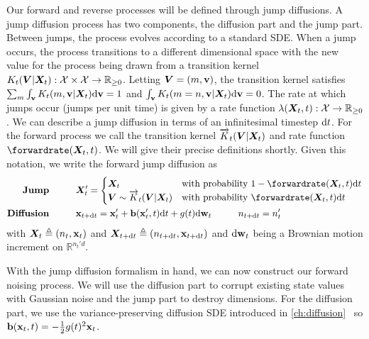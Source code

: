 Our forward and reverse processes will be defined through jump diffusions. A jump diffusion process has two components, the diffusion part and the jump part. Between jumps, the process evolves according to a standard SDE. When a jump occurs, the process transitions to a different dimensional space with the new value for the process being drawn from a transition kernel $K_t({\bm{V}} | {\bm{X}}_t): {\mathcal{X}} \times {\mathcal{X}} \rightarrow  \mathbb{R}_{\geq 0}$. Letting ${\bm{V}} = (m, {\mathbf{v}})$, the transition kernel satisfies $\sum_m \int_{\mathbf{v}} K_t(m, {\mathbf{v}} | {\bm{X}}_t) \mathrm{d} {\mathbf{v}} = 1$ and $\int_{\mathbf{v}} K_t(m=n, {\mathbf{v}} | {\bm{X}}_t) \mathrm{d} {\mathbf{v}} = 0$. The rate at which jumps occur (jumps per unit time) is given by a rate function $\lambda({\bm{X}}_t, t): \mathcal{X} \rightarrow \mathbb{R}_{\geq 0}$. 
We can describe a jump diffusion in terms of an infinitesimal timestep $\mathrm{d} t$. For the forward process we call the transition kernel $\overrightarrow{K}_t({\bm{V}}|{\bm{X}}_t)$ and rate function $\forwardrate(\mX_t, t)$. We will give their precise definitions shortly. Given this notation, we write the forward jump diffusion as
\begin{align}
    \textbf{Jump} \hspace{1cm} & \mX_t' = \begin{cases}
        \mX_t & \text{with probability } 1 - \forwardrate(\mX_t, t) \rmd t \\
        \mV \sim \ftk_t( \mV |\mX_t) & \text{with probability } \forwardrate(\mX_t, t) \rmd t
    \end{cases}  \label{eq:tddm-forward-jump} \\
    \textbf{Diffusion} \hspace{1cm} &\rvx_{t+ \rmd t} = \rvx'_t + \rvb(\rvx'_t, t) \rmd t + g(t) \rmd \brown_t \hspace{1cm} n_{t+\rmd t} = n_t'
     \label{eq:tddm-forward-diffusion}
\end{align}
with ${\bm{X}}_t \triangleq (n_t, {\mathbf{x}}_t)$ and ${\bm{X}}_{t+\mathrm{d} t} \triangleq (n_{t+\mathrm{d} t}, {\mathbf{x}}_{t + \mathrm{d} t})$ and $\mathrm{d} \mathbf{w}_t$ being a Brownian motion increment on $\mathbb{R}^{n_t'd}$.

With the jump diffusion formalism in hand, we can now construct our forward noising process. We will use the diffusion part to corrupt existing state values with Gaussian noise and the jump part to destroy dimensions. For the diffusion part, we use the variance-preserving diffusion SDE introduced in \cref{ch:diffusion}~\citep{ho2020denoising, song2020score} so ${\mathbf{b}}({\mathbf{x}}_t, t) = -\frac{1}{2}g(t)^2 {\mathbf{x}}_t$.

